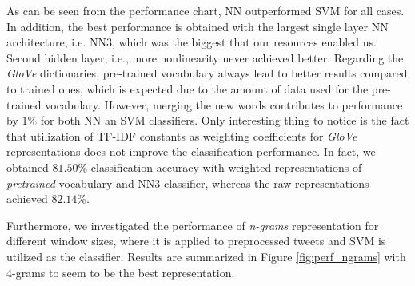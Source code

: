 As can be seen from the performance chart, NN outperformed SVM for all cases.
In addition, the best performance is obtained with the largest single layer NN architecture, i.e. NN3, which was the biggest that our resources enabled us.
Second hidden layer, i.e., more nonlinearity never achieved better.
Regarding the \textit{GloVe} dictionaries, pre-trained vocabulary always lead to better results compared to trained ones, which is expected due to the amount of data used for the pre-trained vocabulary.
However, merging the new words contributes to performance by $1\%$ for both NN an SVM classifiers.
Only interesting thing to notice is the fact that utilization of TF-IDF constants as weighting coefficients for \textit{GloVe} representations does not improve the classification performance.
In fact, we obtained $81.50\%$ classification accuracy with weighted representations of \textit{pretrained} vocabulary and NN3 classifier, whereas the raw representations achieved $82.14\%$.

Furthermore, we investigated the performance of \textit{n-grams} representation for different window sizes, where it is applied to preprocessed tweets and SVM is utilized as the classifier.
Results are summarized in Figure \ref{fig:perf_ngrams}
with 4-grams to seem to be the best representation.

